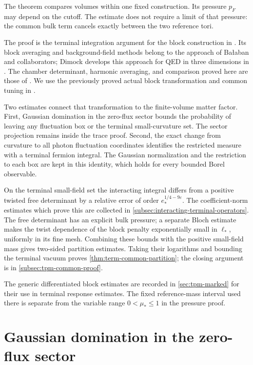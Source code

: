 The theorem compares volumes within one fixed construction.
Its pressure $p_F$ may depend on the cutoff. The estimate
does not require a limit of that pressure: the common bulk term
cancels exactly between the two reference tori.

The proof is the terminal integration argument for the block
construction in \cite[\S21--22]{QED3Master}. Its block averaging
and background-field methods belong to the approach of
Ba{\l}aban and collaborators; Dimock develops this approach for
QED in three dimensions in \cite[\S1--2]{DimockUVS2022}.
The chamber determinant, harmonic averaging, and comparison
proved here are those of \cite[\S22]{QED3Master}.
We use the previously proved actual block transformation and
common tuning in \cite{MaxwellBlock,FermionBlock,NormalizedContraction,NonlinearStep,CoverTuning}.

Two estimates connect that transformation to the finite-volume
matter factor. First, Gaussian domination in the zero-flux
sector bounds the probability of leaving any fluctuation box
or the terminal small-curvature set. The sector projection
remains inside the trace proof. Second, the exact change from
curvature to all photon fluctuation coordinates identifies the
restricted measure with a terminal fermion integral. The Gaussian
normalization and the restriction to each box are kept in this
identity, which holds for every bounded Borel observable.

On the terminal small-field set the interacting integral differs
from a positive twisted free determinant by a relative error
of order $e_*^{1/4-9\varepsilon}$. The coefficient-norm estimates
which prove this are collected in
\cref{subsec:interacting-terminal-operators}.
The free determinant has an explicit bulk pressure; a separate
Bloch estimate makes the twist dependence of the block penalty
exponentially small in $\ell_*$, uniformly in its fine mesh.
Combining these bounds with the positive small-field mass gives
two-sided partition estimates. Taking their logarithms and
bounding the terminal vacuum proves \cref{thm:term-common-partition};
the closing argument is in \cref{subsec:tpm-common-proof}.

The generic differentiated block estimates are recorded in
\cref{sec:tpm-marked} for their use in terminal response
estimates. The fixed reference-mass interval used there is
separate from the variable range $0<\mu_*\le1$ in the pressure proof.
\section{Gaussian domination in the zero-flux sector}
\label{subsec:interacting-zero-flux-Gaussian}

